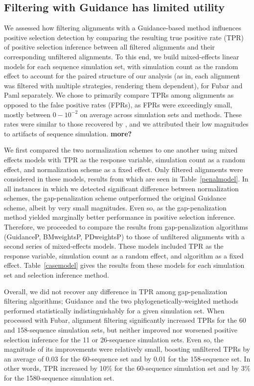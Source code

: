 \documentclass[10pt]{article}
\begin{document}
\subsection*{Filtering with Guidance has limited utility}

We assessed how filtering alignments with a Guidance-based method influences positive selection detection by comparing the resulting true positive rate (TPR) of positive selection inference between all filtered alignments and their corresponding unfiltered alignments. To this end, we build mixed-effects linear models for each sequence simulation set, with simulation count as the random effect to account for the paired structure of our analysis (as in, each alignment was filtered with multiple strategies, rendering them dependent), for Fubar and Paml separately. We chose to primarily compare TPRs among alignments as opposed to the false positive rates (FPRs), as FPRs were exceedingly small, mostly between $0-10^{-2}$ on average across simulation sets and methods. These rates were similar to those recovered by \citep{Jordan2011}, and we attributed their low magnitudes to artifacts of sequence simulation. \textbf{more?}

We first compared the two normalization schemes to one another using mixed effects models with TPR as the response variable, simulation count as a random effect, and normalization scheme as a fixed effect. Only filtered alignments were considered in these models, results from which are seen in Table~\ref{penalmodel}. In all instances in which we detected significant difference between normalization schemes, the gap-penalization scheme outperformed the original Guidance scheme, albeit by very small magnitudes. Even so, as the gap-penalization method yielded marginally better performance in positive selection inference. Therefore, we proceeded to compare the results from gap-penalization algorithms (GuidanceP, BMweightsP, PDweightsP) to those of unfiltered alignments with a second series of mixed-effects models. These models included TPR as the response variable, simulation count as a random effect, and algorithm as a fixed effect. Table~\ref{casemodel} gives the results from these models for each simulation set and selection inference method.

Overall, we did not recover any difference in TPR among gap-penalization filtering algorithms; Guidance and the two phylogenetically-weighted methods performed statistically indistinguishably for a given simulation set. When processed with Fubar, alignment filtering significantly increased TPRs for the 60 and 158-sequence simulation sets, but neither improved nor worsened positive selection inference for the 11 or 26-sequence simulation sets. Even so, the magnitude of its improvements were relatively small, boosting unfiltered TPRs by an average of 0.03 for the 60-sequence set and by 0.01 for the 158-sequence set. In other words, TPR increased by 10\% for the 60-sequence simulation set and by 3\% for the 1580-sequence simulation set.
\end{document}
